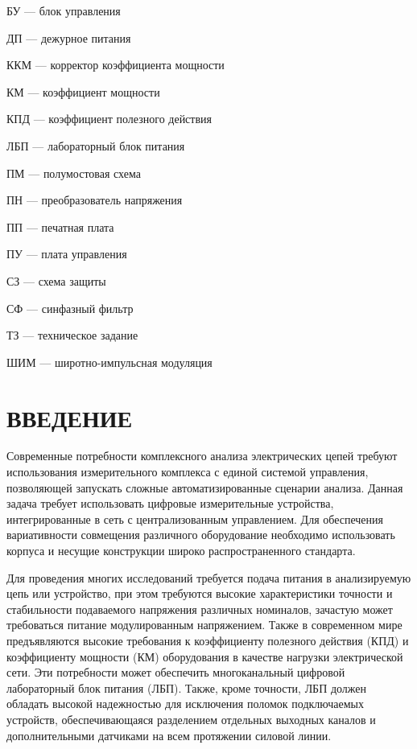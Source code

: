 \documentclass[utf8x, 14pt, oneside, a4paper]{article}
\begin{document}
	БУ --- блок управления
	
	ДП --- дежурное питания
	
	ККМ --- корректор коэффициента мощности
	
	КМ --- коэффициент мощности
	
	КПД --- коэффициент полезного действия
	
	ЛБП --- лабораторный блок питания
	
	ПМ --- полумостовая схема
	
	ПН --- преобразователь напряжения
	
	ПП --- печатная плата
	
	ПУ --- плата управления
	
	СЗ --- схема защиты
	
	СФ --- синфазный фильтр
	
	ТЗ --- техническое задание
		
	ШИМ --- широтно-импульсная модуляция
	
	\pagebreak
	
	\section*{ВВЕДЕНИЕ}
	
	Современные потребности комплексного анализа электрических цепей требуют использования измерительного комплекса с единой системой	управления, позволяющей запускать сложные автоматизированные сценарии
	анализа. Данная задача требует использовать цифровые измерительные устройства, интегрированные в сеть с централизованным управлением. Для обеспечения вариативности совмещения различного оборудование необходимо использовать корпуса и несущие конструкции широко распространенного стандарта.
		
	Для проведения многих исследований требуется подача питания	в анализируемую цепь или устройство, при этом требуются высокие характеристики точности и стабильности подаваемого напряжения	различных номиналов, зачастую может требоваться питание модулированным напряжением. Также в современном мире предъявляются высокие требования к коэффициенту полезного действия (КПД) и коэффициенту мощности (КМ) оборудования в качестве нагрузки электрической сети. Эти потребности может обеспечить многоканальный цифровой лабораторный блок питания (ЛБП). Также, кроме точности, ЛБП должен обладать высокой надежностью для исключения поломок подключаемых устройств, обеспечивающаяся разделением отдельных выходных каналов и дополнительными датчиками на всем протяжении силовой линии.
	
\end{document}
